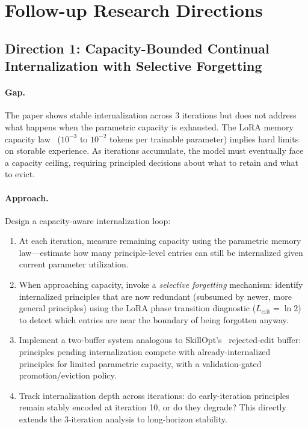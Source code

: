 \documentclass[11pt,a4paper]{article}
\begin{document}
\section{Follow-up Research Directions}

\subsection{Direction 1: Capacity-Bounded Continual Internalization with Selective Forgetting}

\paragraph{Gap.} The paper shows stable internalization across 3 iterations but does not address what happens when the parametric capacity is exhausted. The LoRA memory capacity law~\cite{xu2026lora} ($10^{-3}$ to $10^{-2}$ tokens per trainable parameter) implies hard limits on storable experience. As iterations accumulate, the model must eventually face a capacity ceiling, requiring principled decisions about what to retain and what to evict.

\paragraph{Approach.} Design a capacity-aware internalization loop:
\begin{enumerate}
\item At each iteration, measure remaining capacity using the parametric memory law---estimate how many principle-level entries can still be internalized given current parameter utilization.
\item When approaching capacity, invoke a \emph{selective forgetting} mechanism: identify internalized principles that are now redundant (subsumed by newer, more general principles) using the LoRA phase transition diagnostic ($L_{\mathrm{crit}} = \ln 2$) to detect which entries are near the boundary of being forgotten anyway.
\item Implement a two-buffer system analogous to SkillOpt's~\cite{skillopt2026} rejected-edit buffer: principles pending internalization compete with already-internalized principles for limited parametric capacity, with a validation-gated promotion/eviction policy.
\item Track internalization depth across iterations: do early-iteration principles remain stably encoded at iteration 10, or do they degrade? This directly extends the 3-iteration analysis to long-horizon stability.
\end{enumerate}
\end{document}
